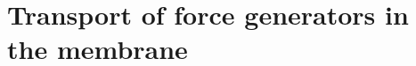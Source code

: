 \documentclass[11pt]{article}
\begin{document}
%
%
%
%

\section{Transport of force generators in the membrane\label{sec:fp}}
\end{document}
